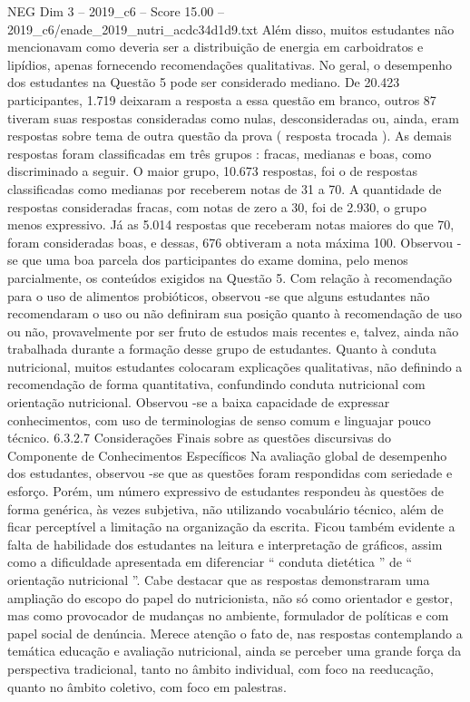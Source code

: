 \begin{textsample}{NEG Dim 3 – 2019\_c6 – Score 15.00 – 2019\_c6/enade\_2019\_nutri\_acdc34d1d9.txt}
Além disso, muitos estudantes não mencionavam como deveria ser a distribuição de energia em carboidratos e lipídios, apenas fornecendo recomendações qualitativas.
No geral, o desempenho dos estudantes na Questão 5 pode ser considerado mediano.
De 20.423 participantes, 1.719 deixaram a resposta a essa questão em branco, outros 87 tiveram suas respostas consideradas como nulas, desconsideradas ou, ainda, eram respostas sobre tema de outra questão da prova ( resposta trocada ).
As demais respostas foram classificadas em três grupos : fracas, medianas e boas, como discriminado a seguir.
O maior grupo, 10.673 respostas, foi o de respostas classificadas como medianas por receberem notas de 31 a 70.
A quantidade de respostas consideradas fracas, com notas de zero a 30, foi de 2.930, o grupo menos expressivo.
Já as 5.014 respostas que receberam notas maiores do que 70, foram consideradas boas, e dessas, 676 obtiveram a nota máxima 100.
Observou -se que uma boa parcela dos participantes do exame domina, pelo menos parcialmente, os conteúdos exigidos na Questão 5.
Com relação à recomendação para o uso de alimentos probióticos, observou -se que alguns estudantes não recomendaram o uso ou não definiram sua posição quanto à recomendação de uso ou não, provavelmente por ser fruto de estudos mais recentes e, talvez, ainda não trabalhada durante a formação desse grupo de estudantes.
Quanto à conduta nutricional, muitos estudantes colocaram explicações qualitativas, não definindo a recomendação de forma quantitativa, confundindo conduta nutricional com orientação nutricional.
Observou -se a baixa capacidade de expressar conhecimentos, com uso de terminologias de senso comum e linguajar pouco técnico. 6.3.2.7 Considerações Finais sobre as questões discursivas do Componente de Conhecimentos Específicos Na avaliação global de desempenho dos estudantes, observou -se que as questões foram respondidas com seriedade e esforço.
Porém, um número expressivo de estudantes respondeu às questões de forma genérica, às vezes subjetiva, não utilizando vocabulário técnico, além de ficar perceptível a limitação na organização da escrita.
Ficou também evidente a falta de habilidade dos estudantes na leitura e interpretação de gráficos, assim como a dificuldade apresentada em diferenciar “ conduta dietética ” de “ orientação nutricional ”.
Cabe destacar que as respostas demonstraram uma ampliação do escopo do papel do nutricionista, não só como orientador e gestor, mas como provocador de mudanças no ambiente, formulador de políticas e com papel social de denúncia.
Merece atenção o fato de, nas respostas contemplando a temática educação e avaliação nutricional, ainda se perceber uma grande força da perspectiva tradicional, tanto no âmbito individual, com foco na reeducação, quanto no âmbito coletivo, com foco em palestras.

\end{textsample}
